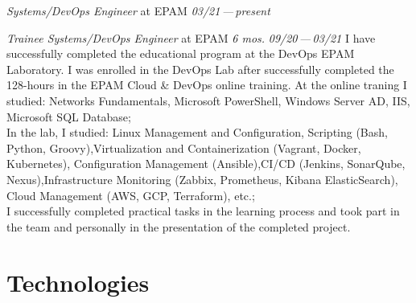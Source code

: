 \documentclass[11pt]{letter}
\newcommand{\forceindent}{\leavevmode{\parindent=1em\indent} %
}
\begin{document}
\begin{etaremune}[
  topsep=1ex,itemsep=1.5ex,partopsep=0ex,
  parsep=0ex,rightmargin=1em,leftmargin=2em
]
  \item
    \emph{Systems/DevOps Engineer}\hfill
    at EPAM\hspace{14em}
    \textit{03/21\,—\,present}\vspace{-1.5ex}\newline

  \item
    \emph{Trainee Systems/DevOps Engineer}\hfill
    at EPAM\hspace{6.3em}
    \textit{6 mos.}\hspace{5em}
    \textit{09/20\,—\,03/21}\vspace{1em}\newline
    \forceindent I have successfully completed the educational program at the DevOps EPAM Laboratory. I was enrolled in the DevOps Lab after successfully completed the 128-hours in the EPAM Cloud \& DevOps online training. At the online traning I studied: 
	Networks Fundamentals, Microsoft PowerShell, Windows Server AD, IIS, Microsoft SQL Database; \\

	\forceindent In the lab, I studied: Linux Management and Configuration, Scripting (Bash, Python, Groovy),Virtualization and Containerization (Vagrant, Docker, Kubernetes), Configuration Management (Ansible),CI/CD (Jenkins, SonarQube, Nexus),Infrastructure Monitoring (Zabbix, Prometheus, Kibana ElasticSearch), Cloud Management (AWS, GCP, Terraform), etc.; \\
	
	\forceindent I successfully completed practical tasks in the learning process and took part in the team and personally in the presentation of the completed project.\\
\end{etaremune}
\newpage

\section*{Technologies\vphantom{tech}}
\end{document}
